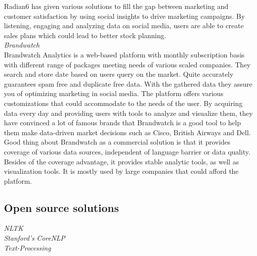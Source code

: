 Radian6 has given various solutions to fill the gap between marketing and customer satisfaction by using social insights to drive marketing campaigns. By listening, engaging and analyzing data on social media, users are able to create sales plans which could lead to better stock planning.\\
\textit{Brandwatch\\}
Brandwatch Analytics is a web-based platform with monthly subscription basis with different range of packages meeting needs of various scaled companies. They search and store date based on users query on the market. Quite accurately guarantees spam free and duplicate free data. With the gathered data they assure you of optimizing marketing in social media. The platform offers various customizations that could accommodate to the needs of the user. By acquiring data every day and providing users with tools to analyze and visualize them, they have convinced a lot of famous brands that Brandwatch is a good tool to help them make data-driven market decisions such as Cisco, British Airways and Dell. 
Good thing about Brandwatch as a commercial solution is that it provides coverage of various data sources, independent of language barrier or data quality. Besides of the coverage advantage, it provides stable analytic tools, as well as visualization tools.  It is mostly used by large companies that could afford the platform.\\
\subsection*{Open source solutions}
\textit{NLTK \\}
\textit{Stanford's CoreNLP \\}
\textit{Text-Processing\\}
